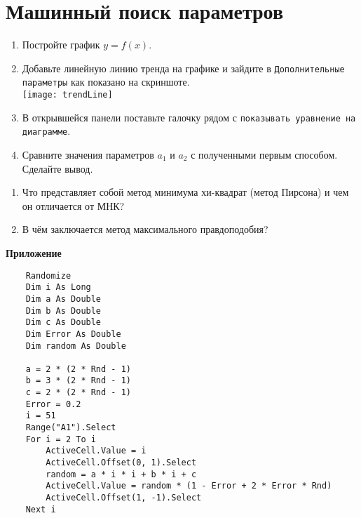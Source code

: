 \documentclass[14pt,a4paper]{article}
\begin{document}
\section{Машинный поиск параметров}
\begin{enumerate}
	\item Постройте график $y = f(x)$.
	\item Добавьте линейную линию тренда на графике и зайдите в \texttt{Дополнительные параметры} как показано на скриншоте.\\
	\texttt{[image: trendLine]}
	\item В открывшейся панели поставьте галочку рядом с \texttt{показывать уравнение на диаграмме}.
	\item Сравните значения параметров $a_1$ и $a_2$ с полученными первым способом. Сделайте вывод.
\end{enumerate}

\questions{}
\begin{enumerate}
	\item Что представляет собой метод минимума хи-квадрат (метод Пирсона) и чем он отличается от МНК?
	\item В чём заключается метод максимального правдоподобия? %
\end{enumerate}

\printbibliography[title={Литература}]	
\begin{center}
	\textbf{\Large Приложение}
\end{center}
	\renewcommand{\lstlistingname}{Листинг}
\begin{lstlisting}
	Randomize
	Dim i As Long
	Dim a As Double
	Dim b As Double
	Dim c As Double
	Dim Error As Double
	Dim random As Double

	a = 2 * (2 * Rnd - 1)
	b = 3 * (2 * Rnd - 1)
	c = 2 * (2 * Rnd - 1)
	Error = 0.2
	i = 51
	Range("A1").Select
	For i = 2 To i
		ActiveCell.Value = i
		ActiveCell.Offset(0, 1).Select
		random = a * i * i + b * i + c
		ActiveCell.Value = random * (1 - Error + 2 * Error * Rnd)
		ActiveCell.Offset(1, -1).Select
	Next i
	\end{lstlisting}
\end{document}
